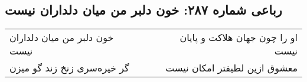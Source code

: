 \begin{center}
\section*{رباعی شماره ۲۸۷: خون دلبر من میان دلداران نیست}
\label{sec:0287}
\begin{longtable}{l p{0.5cm} r}
خون دلبر من میان دلداران نیست
&&
او را چون جهان هلاکت و پایان نیست
\\
گر خیره‌سری زنخ زند گو میزن
&&
معشوق ازین لطیفتر امکان نیست
\\
\end{longtable}
\end{center}
